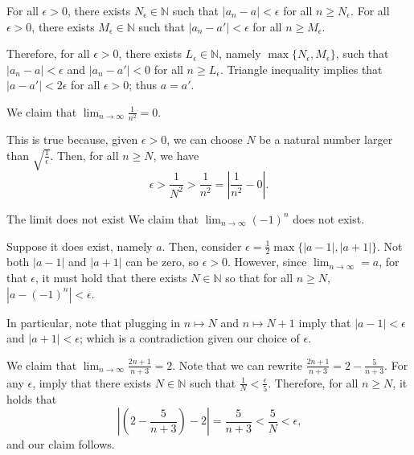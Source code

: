 \begin{dem}{}{}
	For all \(\epsilon > 0\), there exists \(N_\epsilon \in \mathbb{N}\) such that \(|a_n - a|<\epsilon\) for all  \(n \geq N_\epsilon\).
	For all \(\epsilon > 0\), there exists \(M_\epsilon \in \mathbb{N}\) such that \(|a_n - a'|<\epsilon\) for all  \(n \geq M_\epsilon\).

	Therefore, for all \(\epsilon > 0\), there exists \(L_\epsilon \in \mathbb{N}\), namely \(\max\{N_\epsilon, M_\epsilon\}\), such that  \(|a_n - a| < \epsilon\) and  \(|a_n - a'| < 0\) for all  \(n \geq L_\epsilon\). Triangle inequality implies that \(|a - a'| < 2\epsilon\) for all \(\epsilon > 0\); thus \(a = a'\).
\end{dem}

\begin{exmp}{}{}
	We claim that \(\lim_{n\to\infty} \frac{1}{n^2} = 0\).

	This is true because, given \(\epsilon > 0\), we can choose \(N\) be a natural number larger than \(\sqrt{\frac{1}{\epsilon}}\). Then, for all \(n \geq N\), we have \[
		\epsilon > \frac{1}{N^2} > \frac{1}{n^2} = \left|\frac{1}{n^2} - 0\right|.
	\]
\end{exmp}

\begin{exmp}{The limit does not exist}{}
	We claim that \(\lim_{n\to\infty} (-1)^n\) does not exist.  

	Suppose it does exist, namely \(a\). Then, consider \(\epsilon = \frac{1}{2} \max\{|a - 1|, |a + 1|\}\). Not both \(|a - 1|\) and  \(|a + 1|\) can be zero, so  \(\epsilon > 0\). However, since \(\lim_{n\to\infty} = a\), for that \(\epsilon\), it must hold that there exists \(N \in \mathbb{N}\) so that for all \(n \geq N\), \(|a - (-1)^n| < \epsilon\).

	In particular, note that plugging in \(n \mapsto N\) and \(n\mapsto N+1\) imply that \(|a - 1| < \epsilon\) and \(|a + 1| < \epsilon\); which is a contradiction given our choice of \(\epsilon\).
\end{exmp}

\begin{exmp}{}{}
	We claim that \(\lim_{n\to\infty} \frac{2n+1}{n+3} = 2\). 
	Note that we can rewrite \(\frac{2n+1}{n+3} = 2 - \frac{5}{n+3}\). For any \(\epsilon\),  imply that there exists \(N \in \mathbb{N}\) such that \(\frac{1}{N} < \frac{\epsilon}{5}\). Therefore, for all \(n \geq N\), it holds that \[
		\left|\left(2 - \frac{5}{n+3}\right) - 2\right| = \frac{5}{n+3} < \frac{5}{N} < \epsilon\text{,}
	\]
	and our claim follows.
\end{exmp}
